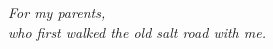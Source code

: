 \thispagestyle{plain}
\vspace*{2.2in}
\begin{center}
  \itshape For my parents,\\
  who first walked the old salt road with me.
\end{center}
\clearpage
